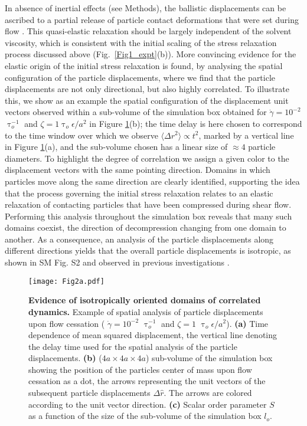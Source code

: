 \documentclass[%
preprint,
 amsmath,amssymb,
 aps,
]{revtex4-1}
\begin{document}
In absence of inertial effects (see Methods), the ballistic displacements can be ascribed to a partial release of particle contact deformations that were set during flow \cite{mohan2013microscopic,khabaz2020particle,mohan2015build}. 
This quasi-elastic relaxation should be largely independent of the solvent viscosity, which is consistent with the initial scaling of the stress relaxation process discussed above (Fig.~\ref{Fig1_expt}(b)). 
More convincing evidence for the elastic origin of the initial stress relaxation is found, by analysing the spatial configuration of the particle displacements, where we find 
that the particle displacements are not only directional, but also highly correlated. To illustrate this, we show as an example the spatial configuration of the displacement unit vectors observed within a sub-volume of the simulation box obtained for $ \dot{\gamma} = 10^{-2}$ $\uptau_o^{-1}$ and $\zeta = 1 \uptau_o \epsilon/a^2$ in Figure \ref{ball}(b); the time delay is here chosen to correspond to the time window over which we observe $\langle \Delta r^2 \rangle \propto t^2 $, marked by a vertical line in Figure \ref{ball}(a), and the sub-volume chosen has a linear size of $\approx 4$ particle diameters. To highlight the degree of correlation we assign a given color to the displacement vectors with the same pointing direction. Domains in which particles move along the same direction are clearly identified, supporting the idea that the process governing the initial stress relaxation relates to an elastic relaxation of contacting particles that have been compressed during shear flow. Performing this analysis throughout the simulation box reveals that many such domains coexist, the direction of decompression changing from one domain to another. As a consequence, an analysis of the particle displacements along different directions yields that the overall particle displacements is isotropic, as shown in SM Fig. S2 and observed in previous investigations \cite{mohan2015build,mohan2013microscopic,khabaz2020particle}. 

\begin{figure}[htbp!]
\texttt{[image: Fig2a.pdf]}
\caption{\label{ball} {\bf Evidence of isotropically oriented  domains of correlated dynamics.} Example of spatial analysis of particle displacements upon flow cessation ( $\dot{\gamma} = 10^{-2}$ $\uptau_o^{-1}$ and $\zeta = 1$ $\uptau_o \epsilon/a^2$). {\bf(a)} Time dependence of mean squared displacement, the vertical line denoting the delay time used for the spatial analysis of the particle displacements. {\bf (b)} ($4a\times 4a \times 4a$) sub-volume of the simulation box showing the position of the particles center of mass upon flow cessation as a dot, the arrows representing the unit vectors of the subsequent particle displacements  $\Delta \hat{r}$. The arrows are colored according to the unit vector direction. 
{\bf(c)} Scalar order parameter $S$ as a function of the size of the sub-volume of the simulation box $l_o$. }
\end{figure}
\end{document}

